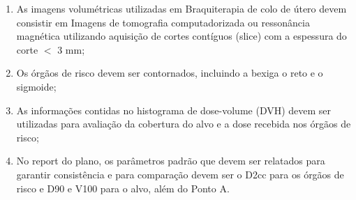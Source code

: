 \documentclass[11pt,a4paper]{article}
\newcounter{exemplo}
\begin{document}
\begin{exemplo}[8. Braquiterapia]
\begin{itemize}
            \begin{enumerate}[label=\textcolor{CarnationPink}{\arabic*.}]
                \item As imagens volumétricas utilizadas em Braquiterapia de colo de útero devem consistir em Imagens de tomografia computadorizada ou ressonância magnética utilizando aquisição de cortes contíguos (slice) com a espessura do corte $<$ 3 mm;
                \item Os órgãos de risco devem ser contornados, incluindo a bexiga o reto e o sigmoide;
                \item As informações contidas no histograma de dose-volume (DVH) devem ser utilizadas para avaliação da cobertura do alvo e a dose recebida nos órgãos de risco;
                \item No report do plano, os parâmetros padrão que devem ser relatados para garantir consistência e para comparação devem ser o D2cc para os órgãos de risco e D90 e V100 para o alvo, além do Ponto A. 
            \end{enumerate}

    \end{itemize}
\end{exemplo}



\end{document}
